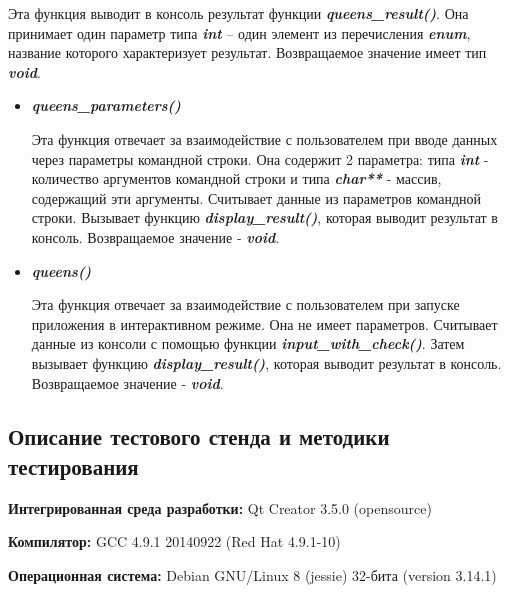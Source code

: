 \documentclass[12pt,a4paper]{report}
\begin{document}
\begin{enumerate}
\begin{itemize}
Эта функция выводит в консоль результат функции \textbf{\textit{queens\_result()}}. Она принимает один параметр типа \textit{\textbf{int}} -- один элемент из перечисления \textit{\textbf{enum}}, название которого характеризует результат. Возвращаемое значение имеет тип \textit{\textbf{void}}.
\end{itemize}

\begin{itemize}
\item \textbf{\textit{queens\_parameters()}}

Эта функция отвечает за взаимодействие с пользователем при вводе данных через параметры командной строки. Она содержит 2 параметра: типа \textbf{\textit{int}} - количество аргументов командной строки и типа \textbf{\textit{char**}} - массив, содержащий эти аргументы. Считывает данные из параметров командной строки. Вызывает функцию %
\textbf{\textit{display\_result()}}, которая выводит результат в консоль. Возвращаемое значение - \textit{\textbf{void}}.
\end{itemize}

\begin{itemize}
\item \textbf{\textit{queens()}}

Эта функция отвечает за взаимодействие с пользователем при запуске приложения в интерактивном режиме. Она не имеет параметров. Считывает данные из консоли с помощью функции \textbf{\textit{input\_with\_check()}}. Затем вызывает функцию %
\textbf{\textit{display\_result()}}, которая выводит результат в консоль. Возвращаемое значение - \textit{\textbf{void}}.
\end{itemize}
\end{enumerate}
\subsection{Описание тестового стенда и методики тестирования}

\begin{flushleft}
\textbf{Интегрированная среда разработки:} Qt Creator 3.5.0 (opensource)

\textbf{Компилятор:} GCC 4.9.1 20140922 (Red Hat 4.9.1-10)

\textbf{Операционная система:} Debian GNU/Linux 8 (jessie) 32-бита (version 3.14.1)
\end{flushleft}
\end{document}
